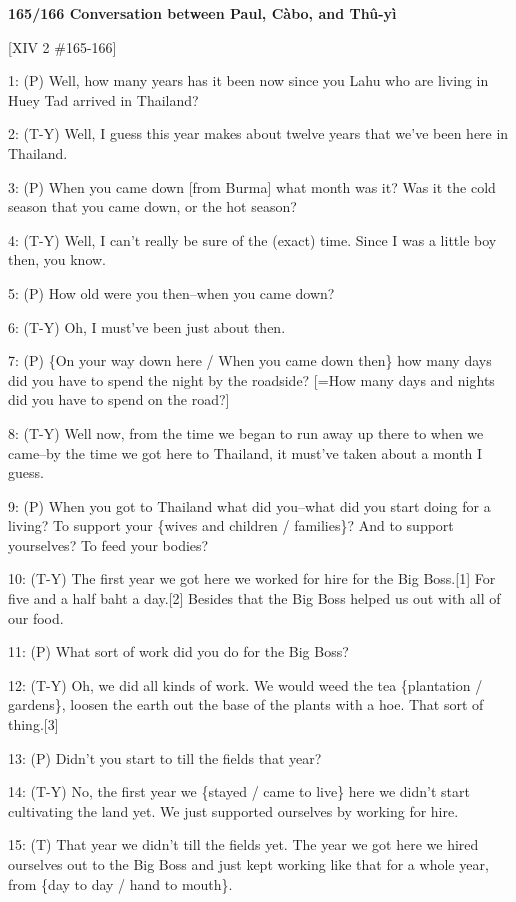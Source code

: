 
\textbf{165/166 Conversation between Paul, Càbo, and Thû-yì}

[XIV 2 \#165-166]

1: (P) Well, how many years has it been now since you Lahu who are living in Huey
Tad arrived in Thailand?

2: (T-Y) Well, I guess this year makes about twelve years that we've been here
in Thailand.

3: (P) When you came down [from Burma] what month was it? Was it the cold season
that you came down, or the hot season?

4: (T-Y) Well, I can't really be sure of the (exact) time. Since I was a little
boy then, you know.

5: (P) How old were you then--when you came down?

6: (T-Y) Oh, I must've been just about then.

7: (P) \{On your way down here / When you came down then\} how many days did you
have to spend the night by the roadside? [=How many days and nights did you have
to spend on the road?]

8: (T-Y) Well now, from the time we began to run away up there to when we came--by
the time we got here to Thailand, it must've taken about a month I guess.

9: (P) When you got to Thailand what did you--what did you start doing for a living?
To support your \{wives and children / families\}? And to support yourselves? To
feed your bodies?

10: (T-Y) The first year we got here we worked for hire for the Big Boss.[1] For
five and a half baht a day.[2] Besides that the Big Boss helped us out with all
of our food.

11: (P) What sort of work did you do for the Big Boss?

12: (T-Y) Oh, we did all kinds of work. We would weed the tea \{plantation / gardens\},
loosen the earth out the base of the plants with a hoe. That sort of thing.[3]

13: (P) Didn't you start to till the fields that year?

14: (T-Y) No, the first year we \{stayed / came to live\} here we didn't start
cultivating the land yet. We just supported ourselves by working for hire.

15: (T) That year we didn't till the fields yet. The year we got here we hired
ourselves out to the Big Boss and just kept working like that for a whole year,
from \{day to day / hand to mouth\}.

